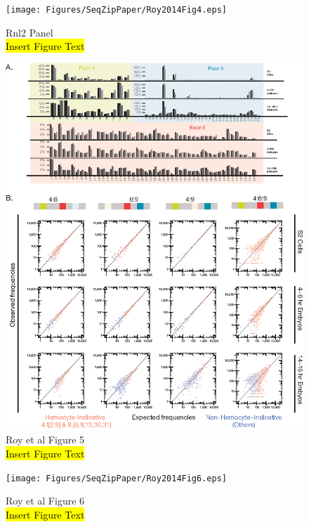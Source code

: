 		\begin{figure}[htbp] %
			\centering 
			\texttt{[image: Figures/SeqZipPaper/Roy2014Fig4.eps]}
			\caption[SeqZip Diagram]
			{
				Rnl2 Panel\\
				\hl{Insert Figure Text}
				}
			\label{fig:Roy2014 F4}
			\end{figure}

		\begin{figure}[htbp] %
			\centering 
			\includegraphics{Figures/SeqZipPaper/Roy2014Fig5.eps}
			\caption[SeqZip Diagram]
			{
				Roy et al Figure 5\\
				\hl{Insert Figure Text}
				}
			\label{fig:Roy2014 F5}
			\end{figure}

		\begin{figure}[htbp] %
			\centering 
			\texttt{[image: Figures/SeqZipPaper/Roy2014Fig6.eps]}
			\caption[SeqZip Diagram]
			{
				Roy et al Figure 6\\
				\hl{Insert Figure Text}
				}
			\label{fig:Roy2014 F6}
			\end{figure}

